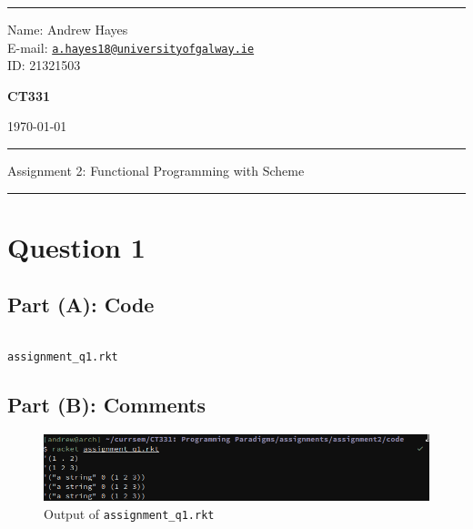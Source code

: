 \documentclass[a4paper]{article}
\newenvironment{code}{\captionsetup{type=listing}}{}
\begin{document}
\hrule \medskip
\begin{minipage}{0.295\textwidth} 
    \raggedright
    \footnotesize 
    Name: Andrew Hayes \\
    E-mail: \href{mailto://a.hayes18@universityofgalway.ie}{\texttt{a.hayes18@universityofgalway.ie}}  \hfill\\   
    ID: 21321503 \hfill
\end{minipage}
\begin{minipage}{0.4\textwidth} 
    \centering 
    \vspace{0.4em}
    \Large 
    \textbf{CT331} \\ 
\end{minipage}
\begin{minipage}{0.295\textwidth} 
    \raggedleft
    \today
\end{minipage}
\medskip\hrule 
\begin{center}
    \normalsize
    Assignment 2: Functional Programming with Scheme
\end{center}
\hrule

\section{Question 1}
\subsection{Part (A): Code}
\begin{code}
\inputminted[texcl, mathescape, breaklines, frame=single]{racket}{../code/assignment_q1.rkt}
\caption{\texttt{assignment\_q1.rkt}}
\end{code}

\subsection{Part (B): Comments}
\begin{figure}[H]
    \centering
    \includegraphics[width=\textwidth]{./images/question1.png}
    \caption{Output of \texttt{assignment\_q1.rkt}}
\end{figure}
\end{document}
